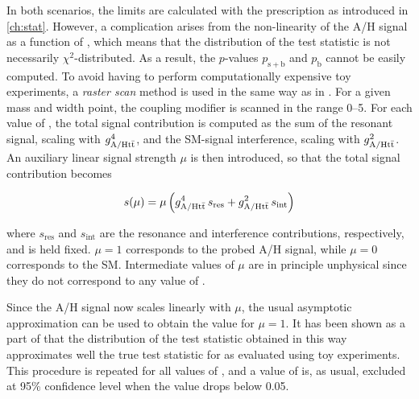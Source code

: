 In both scenarios, the limits are calculated with the \CLs prescription as introduced in \cref{ch:stat}. However, a complication arises from the non-linearity of the A/H signal as a function of \gAHtt, which means that the distribution of the test statistic is not necessarily $\chi^2$-distributed. As a result, the $p$-values $p_{\mathrm{s+b}}$ and $p_{\mathrm{b}}$ cannot be easily computed. To avoid having to perform computationally expensive toy experiments, a \textit{raster scan} method is used in the same way as in . For a given \AH mass and width point, the coupling modifier \gAHtt is scanned in the range 0--5. For each value of \gAHtt, the total signal contribution is computed as the sum of the resonant signal, scaling with $g_{\mathrm{A/H t \bar{t}}}^4$, and the SM-signal interference, scaling with $g_{\mathrm{A/H t \bar{t}}}^2$. An auxiliary linear signal strength $\mu$ is then introduced, so that the total signal contribution becomes

\begin{equation}
    s (\mu) = \mu \left( g_{\mathrm{A/H t \bar{t}}}^4 \, s_{\mathrm{res}} + g_{\mathrm{A/H t \bar{t}}}^2 \, s_{\mathrm{int}} \right)
\end{equation}

\noindent where $s_{\mathrm{res}}$ and $s_{\mathrm{int}}$ are the resonance and interference contributions, respectively, and \gAHtt is held fixed. $\mu = 1$ corresponds to the probed A/H signal, while $\mu = 0$ corresponds to the SM. Intermediate values of $\mu$ are in principle unphysical since they do not correspond to any value of \gAHtt.

Since the A/H signal now scales linearly with $\mu$, the usual asymptotic approximation can be used to obtain the \CLs value for $\mu = 1$. It has been shown as a part of  that the distribution of the test statistic obtained in this way approximates well the true test statistic for \gAHtt as evaluated using toy experiments. This procedure is repeated for all values of \gAHtt, and a value of \gAHtt is, as usual, excluded at 95\% confidence level when the \CLs value drops below 0.05. 

